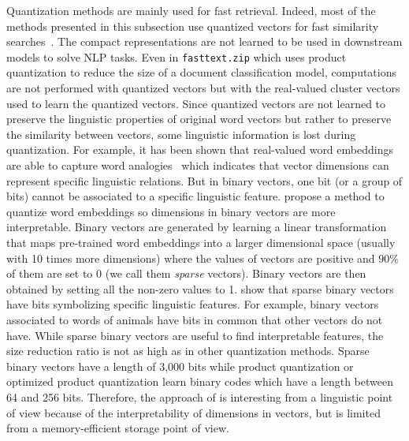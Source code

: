     Quantization methods are mainly used for fast retrieval. Indeed, most of the
    methods presented in this subsection use quantized vectors for fast
    similarity searches~\citep{jegou2010product, ge2013optimized, ling2016word}.
    The compact representations are not learned to be used in downstream models
    to solve NLP tasks. Even in \texttt{fasttext.zip} which uses product
    quantization to reduce the size of a document classification model,
    computations are not performed with quantized vectors but with the
    real-valued cluster vectors used to learn the quantized vectors. Since
    quantized vectors are not learned to preserve the linguistic properties of
    original word vectors but rather to preserve the similarity between vectors,
    some linguistic information is lost during quantization. For example, it has
    been shown that real-valued word embeddings are able to capture word
    analogies~\citep{mikolov2013distributed} which indicates that vector
    dimensions can represent specific linguistic relations. But in binary
    vectors, one bit (or a group of bits) cannot be associated to a specific
    linguistic feature. \citeauthor{faruqui2015sparse} \citep{faruqui2015sparse}
    propose a method to quantize word embeddings so dimensions in binary vectors
    are more interpretable. Binary vectors are generated by learning a linear
    transformation that maps pre-trained word embeddings into a larger
    dimensional space (usually with 10 times more dimensions) where the values
    of vectors are positive and $90\%$ of them are set to $0$ (we call them
    \textit{sparse} vectors). Binary vectors are then obtained by setting all
    the non-zero values to 1. \citeauthor{faruqui2015sparse} show that sparse
    binary vectors have bits symbolizing specific linguistic features. For
    example, binary vectors associated to words of animals have bits in common
    that other vectors do not have. While sparse binary vectors are useful to
    find interpretable features, the size reduction ratio is not as high as in
    other quantization methods. Sparse binary vectors have a length of 3,000
    bits while product quantization or optimized product quantization learn
    binary codes which have a length between 64 and 256 bits. Therefore, the
    approach of \citeauthor{faruqui2015sparse} is interesting from a linguistic
    point of view because of the interpretability of dimensions in vectors, but
    is limited from a memory-efficient storage point of view.

